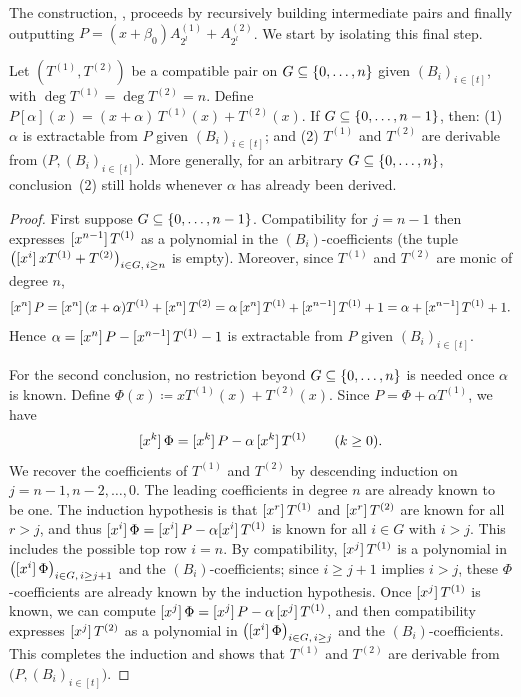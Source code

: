 The construction, , proceeds by recursively building intermediate pairs and finally outputting
$P=(x+\beta_0)A^{(1)}_{2^l}+A^{(2)}_{2^l}$.
We start by isolating this final step.

\begin{lemma}\label{lem:x-alpha-extraction}
    Let $(T^{(1)}, T^{(2)})$ be a compatible pair on
    $G \subseteq \idx{n}$ given $(B_i)_{i \in [t]}$, with
    $\deg T^{(1)}=\deg T^{(2)}=n$.
    Define $P[\alpha](x)=(x+\alpha)\,T^{(1)}(x)+T^{(2)}(x)$.
    If $G\subseteq\rng n$, then: (1) $\alpha$ is extractable from $P$
    given $(B_i)_{i\in[t]}$; and (2) $T^{(1)}$ and $T^{(2)}$ are
    derivable from $\bigl(P,(B_i)_{i\in[t]}\bigr)$.
    More generally, for an arbitrary $G\subseteq\idx n$, conclusion~(2)
    still holds whenever $\alpha$ has already been derived.
\end{lemma}
\begin{proof}
    First suppose $G \subseteq \rng{n}$.  Compatibility for $j=n-1$
    then expresses $\coeff{T^{(1)}}{n-1}$ as a polynomial in the
    $(B_i)$-coefficients (the tuple
    $\bigl(\coeff{xT^{(1)}+T^{(2)}}{i}\bigr)_{i\in G,\, i\ge n}$ is
    empty).
    Moreover, since $T^{(1)}$ and $T^{(2)}$ are monic of degree $n$,
    \[
        \coeff{P}{n}
            = \coeff{(x+\alpha)T^{(1)}}{n} + \coeff{T^{(2)}}{n}
            = \alpha\,\coeff{T^{(1)}}{n} + \coeff{T^{(1)}}{n-1} + 1
            = \alpha + \coeff{T^{(1)}}{n-1} + 1.
    \]
    Hence $\alpha=\coeff{P}{n}-\coeff{T^{(1)}}{n-1}-1$ is extractable from $P$ given $(B_i)_{i\in[t]}$.

    For the second conclusion, no restriction beyond $G\subseteq\idx n$
    is needed once $\alpha$ is known.  Define
    $\Phi(x)\coloneqq xT^{(1)}(x)+T^{(2)}(x)$. Since
    $P=\Phi+\alpha T^{(1)}$, we have
    \[
        \coeff{\Phi}{k}=\coeff{P}{k}-\alpha\,\coeff{T^{(1)}}{k}\qquad(k\ge 0).
    \]
    We recover the coefficients of $T^{(1)}$ and $T^{(2)}$ by descending induction on $j=n-1,n-2,\ldots,0$.
    The leading coefficients in degree $n$ are already known to be one.
    The induction hypothesis is that $\coeff{T^{(1)}}{r}$ and
    $\coeff{T^{(2)}}{r}$ are known for all $r>j$, and thus
    $\coeff{\Phi}{i}=\coeff{P}{i}-\alpha\coeff{T^{(1)}}{i}$ is known for
    all $i\in G$ with $i>j$.  This includes the possible top row $i=n$.
    By compatibility, $\coeff{T^{(1)}}{j}$ is a polynomial in $\bigl(\coeff{\Phi}{i}\bigr)_{i\in G,\,i\ge j+1}$ and the $(B_i)$-coefficients; since $i\ge j+1$ implies $i>j$, these $\Phi$-coefficients are already known by the induction hypothesis.
    Once $\coeff{T^{(1)}}{j}$ is known, we can compute $\coeff{\Phi}{j}=\coeff{P}{j}-\alpha\,\coeff{T^{(1)}}{j}$, and then compatibility expresses $\coeff{T^{(2)}}{j}$ as a polynomial in $\bigl(\coeff{\Phi}{i}\bigr)_{i\in G,\,i\ge j}$ and the $(B_i)$-coefficients.
    This completes the induction and shows that $T^{(1)}$ and $T^{(2)}$ are derivable from $\bigl(P,(B_i)_{i\in[t]}\bigr)$.
\end{proof}

